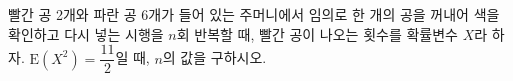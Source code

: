 빨간 공 2개와 파란 공 6개가 들어 있는 주머니에서 임의로 한 개의 공을 꺼내어 색을 확인하고 다시 넣는 시행을 $n$회 반복할 때, 빨간 공이 나오는 횟수를 확률변수 $X$라 하자. $\mathrm{E}(X^2)=\dfrac{11}{2}$일 때, $n$의 값을 구하시오.
